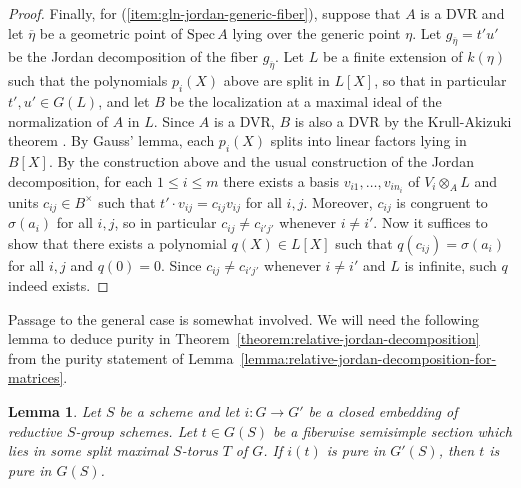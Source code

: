 \documentclass[11pt,reqno]{amsart}
\newtheorem{lemma}[theorem]{Lemma}
\theoremstyle{definition}
\newcommand{\Spec}{\mathrm{Spec} \,}
\begin{document}
\begin{proof}
Finally, for (\ref{item:gln-jordan-generic-fiber}), suppose that $A$ is a DVR and let $\overline{\eta}$ be a geometric point of $\Spec A$ lying over the generic point $\eta$. Let $g_{\overline{\eta}} = t' u'$ be the Jordan decomposition of the fiber $g_{\overline{\eta}}$. Let $L$ be a finite extension of $k(\eta)$ such that the polynomials $p_i(X)$ above are split in $L[X]$, so that in particular $t', u' \in G(L)$, and let $B$ be the localization at a maximal ideal of the normalization of $A$ in $L$. Since $A$ is a DVR, $B$ is also a DVR by the Krull-Akizuki theorem \cite[Thm.\ 11.7]{Matsumura}. By Gauss' lemma, each $p_i(X)$ splits into linear factors lying in $B[X]$. By the construction above and the usual construction of the Jordan decomposition, for each $1 \leq i \leq m$ there exists a basis $v_{i1}, \dots, v_{in_i}$ of $V_i \otimes_A L$ and units $c_{ij} \in B^\times$ such that $t' \cdot v_{ij} = c_{ij} v_{ij}$ for all $i, j$. Moreover, $c_{ij}$ is congruent to $\sigma(a_i)$ for all $i, j$, so in particular $c_{ij} \neq c_{i'j'}$ whenever $i \neq i'$. Now it suffices to show that there exists a polynomial $q(X) \in L[X]$ such that $q(c_{ij}) = \sigma(a_i)$ for all $i, j$ and $q(0) = 0$. Since $c_{ij} \neq c_{i'j'}$ whenever $i \neq i'$ and $L$ is infinite, such $q$ indeed exists.
\end{proof}

Passage to the general case is somewhat involved. We will need the following lemma to deduce purity in Theorem~\ref{theorem:relative-jordan-decomposition} from the purity statement of Lemma~\ref{lemma:relative-jordan-decomposition-for-matrices}.

\begin{lemma}\label{lemma:purity-checked-after-extension}
Let $S$ be a scheme and let $i: G \to G'$ be a closed embedding of reductive $S$-group schemes. Let $t \in G(S)$ be a fiberwise semisimple section which lies in some split maximal $S$-torus $T$ of $G$. If $i(t)$ is pure in $G'(S)$, then $t$ is pure in $G(S)$.
\end{lemma}
\end{document}
